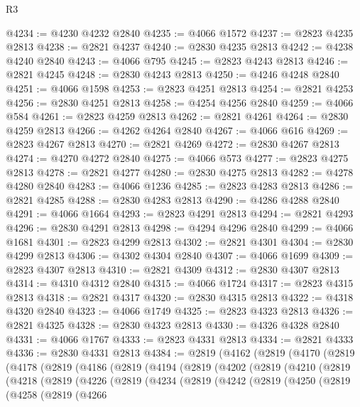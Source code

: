 \begin{lexlean}{R3}
\begin{coremodule}
@4234 := @4230 @4232 @2840
@4235 := @4066 @1572
@4237 := @2823 @4235 @2813
@4238 := @2821 @4237
@4240 := @2830 @4235 @2813
@4242 := @4238 @4240 @2840
@4243 := @4066 @795
@4245 := @2823 @4243 @2813
@4246 := @2821 @4245
@4248 := @2830 @4243 @2813
@4250 := @4246 @4248 @2840
@4251 := @4066 @1598
@4253 := @2823 @4251 @2813
@4254 := @2821 @4253
@4256 := @2830 @4251 @2813
@4258 := @4254 @4256 @2840
@4259 := @4066 @584
@4261 := @2823 @4259 @2813
@4262 := @2821 @4261
@4264 := @2830 @4259 @2813
@4266 := @4262 @4264 @2840
@4267 := @4066 @616
@4269 := @2823 @4267 @2813
@4270 := @2821 @4269
@4272 := @2830 @4267 @2813
@4274 := @4270 @4272 @2840
@4275 := @4066 @573
@4277 := @2823 @4275 @2813
@4278 := @2821 @4277
@4280 := @2830 @4275 @2813
@4282 := @4278 @4280 @2840
@4283 := @4066 @1236
@4285 := @2823 @4283 @2813
@4286 := @2821 @4285
@4288 := @2830 @4283 @2813
@4290 := @4286 @4288 @2840
@4291 := @4066 @1664
@4293 := @2823 @4291 @2813
@4294 := @2821 @4293
@4296 := @2830 @4291 @2813
@4298 := @4294 @4296 @2840
@4299 := @4066 @1681
@4301 := @2823 @4299 @2813
@4302 := @2821 @4301
@4304 := @2830 @4299 @2813
@4306 := @4302 @4304 @2840
@4307 := @4066 @1699
@4309 := @2823 @4307 @2813
@4310 := @2821 @4309
@4312 := @2830 @4307 @2813
@4314 := @4310 @4312 @2840
@4315 := @4066 @1724
@4317 := @2823 @4315 @2813
@4318 := @2821 @4317
@4320 := @2830 @4315 @2813
@4322 := @4318 @4320 @2840
@4323 := @4066 @1749
@4325 := @2823 @4323 @2813
@4326 := @2821 @4325
@4328 := @2830 @4323 @2813
@4330 := @4326 @4328 @2840
@4331 := @4066 @1767
@4333 := @2823 @4331 @2813
@4334 := @2821 @4333
@4336 := @2830 @4331 @2813
@4384 := @2819
    (@4162
      (@2819
        (@4170
          (@2819
            (@4178
              (@2819
                (@4186
                  (@2819
                    (@4194
                      (@2819
                        (@4202
                          (@2819
                            (@4210
                              (@2819
                                (@4218
                                  (@2819
                                    (@4226
                                      (@2819
                                        (@4234
                                          (@2819
                                            (@4242
                                              (@2819
                                                (@4250
                                                  (@2819
                                                    (@4258
                                                      (@2819
                                                        (@4266

\end{coremodule}
\end{lexlean}
